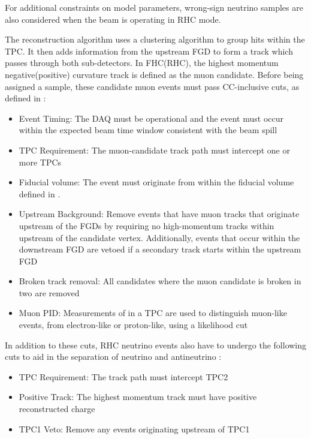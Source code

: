 For additional constraints on model parameters, wrong-sign neutrino samples are also considered when the beam is operating in RHC mode.

The reconstruction algorithm uses a clustering algorithm to group hits within the TPC. It then adds information from the upstream FGD to form a track which passes through both sub-detectors. In FHC(RHC), the highest momentum negative(positive) curvature track is defined as the muon candidate. Before being assigned a sample, these candidate muon events must pass CC-inclusive cuts, as defined in \cite{t2k_tn_212}:

\begin{itemize}
\item Event Timing: The DAQ must be operational and the event must occur within the expected beam time window consistent with the beam spill
\item TPC Requirement: The muon-candidate track path must intercept one or more TPCs
\item Fiducial volume: The event must originate from within the fiducial volume defined in \cite{thesis_will}.
\item Upstream Background: Remove events that have muon tracks that originate upstream of the FGDs by requiring no high-momentum tracks within  upstream of the candidate vertex. Additionally, events that occur within the downstream FGD are vetoed if a secondary track starts within the upstream FGD
\item Broken track removal: All candidates where the muon candidate is broken in two are removed
\item Muon PID: Measurements of  in a TPC are used to distinguish muon-like events, from electron-like or proton-like, using a likelihood cut
\end{itemize}

In addition to these cuts, RHC neutrino events also have to undergo the following cuts to aid in the separation of neutrino and antineutrino \cite{t2k_tn_246}:

\begin{itemize}
\item TPC Requirement: The track path must intercept TPC2
\item Positive Track: The highest momentum track must have positive reconstructed charge
\item TPC1 Veto: Remove any events originating upstream of TPC1
\end{itemize}

